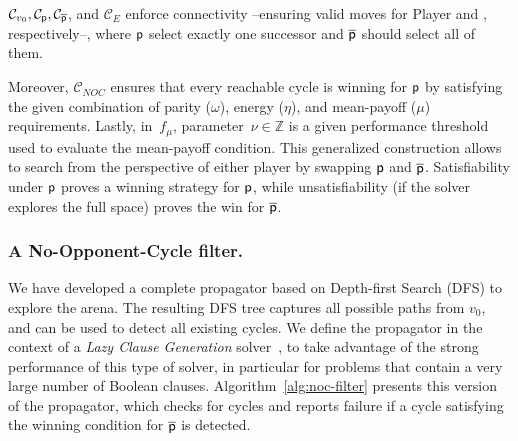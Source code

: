 \documentclass[a4paper,UKenglish,cleveref, autoref, thm-restate, anonymous]{lipics-v2021}
\begin{document}
$\mathcal{C}_{v_0}, \mathcal{C}_{\mathsf{p}}, \mathcal{C}_{\overline{\mathsf{p}}}$, and $\mathcal{C}_{\!E}$ enforce connectivity --ensuring valid moves for Player \even and \odd, respectively--, where $\mathsf{p}$ select exactly one successor and $\overline{\mathsf{p}}$ should select all of them.  

Moreover, $\mathcal{C}_{\!N\!O\!C}$ ensures that every reachable cycle is winning for $\mathsf{p}$ by satisfying the given combination of parity ($\omega$), energy ($\eta$), and mean-payoff ($\mu$) requirements. Lastly, in~$f_\mu$, parameter~$\nu \in \mathbb{Z}$ is a given performance threshold used to evaluate the mean-payoff condition. This generalized construction allows \nocq to search from the perspective of either player by swapping $\mathsf{p}$ and $\overline{\mathsf{p}}$. Satisfiability under $\mathsf{p}$ proves a winning strategy for $\mathsf{p}$, while unsatisfiability (if the solver explores the full space) proves the win for $\overline{\mathsf{p}}$.

\subsubsection{A No-Opponent-Cycle filter.} \label{sec:nocfilter}
We have developed a complete propagator based on Depth-first Search (DFS) to explore the arena. The resulting DFS tree captures all possible paths from $v_0$, and can be used to detect all existing cycles. We define the propagator in the context of a \textit{Lazy Clause Generation} solver~\cite{chuffed:2018}, to take advantage of the strong performance of this type of solver, in particular for problems that contain a very large number of Boolean clauses. Algorithm~\ref{alg:noc-filter} presents this version of the propagator, which checks for cycles and reports failure if a cycle 
satisfying the winning condition for 
$\overline{\mathsf{p}}$ is detected.
\end{document}
